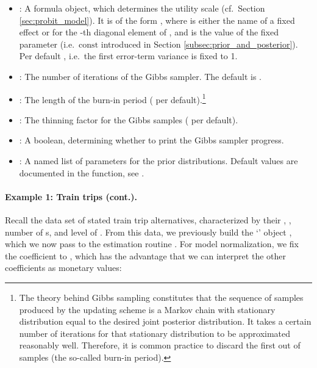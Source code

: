 \documentclass[article,shortnames]{jss}
\newcommand{\class}[1]{`\code{#1}'}
\newcommand{\fct}[1]{\code{#1()}}
\begin{document}
\begin{itemize}
  \item {}: A formula object, which determines the utility scale (cf.\ Section \ref{sec:probit_model}). It is of the form , where  is either the name of a fixed effect or  for the -th diagonal element of , and  is the value of the fixed parameter (i.e.\ $\text{const}$ introduced in Section \ref{subsec:prior_and_posterior}). Per default , i.e.\ the first error-term variance is fixed to 1.
  \item {}: The number of iterations of the Gibbs sampler. The default is .
  \item {}: The length of the burn-in period ( per default).\footnote{The theory behind Gibbs sampling constitutes that the sequence of samples produced by the
updating scheme is a Markov chain with stationary distribution equal to the desired joint posterior distribution. It takes a certain number of iterations for that stationary distribution to be approximated reasonably well. Therefore, it is common practice to discard the first  out of  samples (the so-called burn-in period).}
  \item {}: The thinning factor for the Gibbs samples ( per default).
  \item {}: A boolean, determining whether to print the Gibbs sampler progress.
  \item {}: A named list of parameters for the prior distributions. Default values are documented in the \fct{check\_prior} function, see .
\end{itemize}

\paragraph{Example 1: Train trips (cont.).}

Recall the  data set of stated train trip alternatives, characterized by their , , number of s, and level of . From this data, we previously build the \class{RprobitB\_data} object , which we now pass to the estimation routine \fct{fit\_model}. For model normalization, we fix the  coefficient to , which has the advantage that we can interpret the other coefficients as monetary values:
\end{document}
